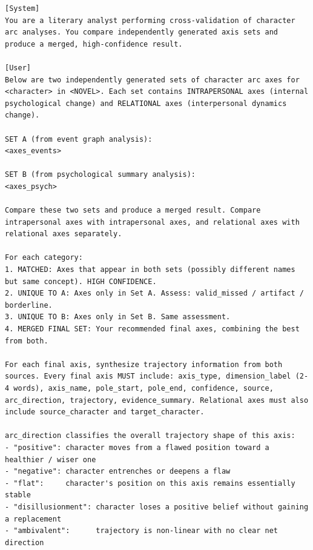 \documentclass[11pt]{article}
\begin{document}
\begin{table}[htbp]
\centering
\caption{Stage~ii cross-stream reconciliation prompt.}
\label{tab:prompt-cross-stream}
\begin{lstlisting}[basicstyle=\ttfamily\scriptsize]
[System]
You are a literary analyst performing cross-validation of character arc analyses. You compare independently generated axis sets and produce a merged, high-confidence result.

[User]
Below are two independently generated sets of character arc axes for <character> in <NOVEL>. Each set contains INTRAPERSONAL axes (internal psychological change) and RELATIONAL axes (interpersonal dynamics change).

SET A (from event graph analysis):
<axes_events>

SET B (from psychological summary analysis):
<axes_psych>

Compare these two sets and produce a merged result. Compare intrapersonal axes with intrapersonal axes, and relational axes with relational axes separately.

For each category:
1. MATCHED: Axes that appear in both sets (possibly different names but same concept). HIGH CONFIDENCE.
2. UNIQUE TO A: Axes only in Set A. Assess: valid_missed / artifact / borderline.
3. UNIQUE TO B: Axes only in Set B. Same assessment.
4. MERGED FINAL SET: Your recommended final axes, combining the best from both.

For each final axis, synthesize trajectory information from both sources. Every final axis MUST include: axis_type, dimension_label (2-4 words), axis_name, pole_start, pole_end, confidence, source, arc_direction, trajectory, evidence_summary. Relational axes must also include source_character and target_character.

arc_direction classifies the overall trajectory shape of this axis:
- "positive": character moves from a flawed position toward a healthier / wiser one
- "negative": character entrenches or deepens a flaw
- "flat":     character's position on this axis remains essentially stable
- "disillusionment": character loses a positive belief without gaining a replacement
- "ambivalent":      trajectory is non-linear with no clear net direction


\end{lstlisting}
\end{table}
\end{document}
